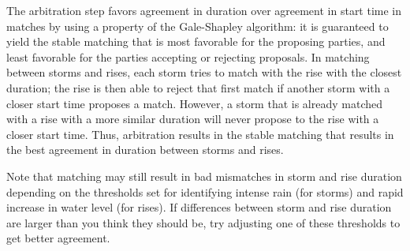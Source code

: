 \documentclass[11pt,a4paper]{article}
\begin{document}
The arbitration step favors agreement in duration over agreement in
start time in matches by using a property of the Gale-Shapley
algorithm: it is guaranteed to yield the stable matching that is most
favorable for the proposing parties, and least favorable for the
parties accepting or rejecting proposals.  In matching between storms
and rises, each storm tries to match with the rise with the closest
duration; the rise is then able to reject that first match if another
storm with a closer start time proposes a match.  However, a storm
that is already matched with a rise with a more similar duration will
never propose to the rise with a closer start time.  Thus, arbitration
results in the stable matching that results in the best agreement in
duration between storms and rises.

Note that matching may still result in bad mismatches in storm and
rise duration depending on the thresholds set for identifying intense
rain (for storms) and rapid increase in water level (for rises).  If
differences between storm and rise duration are larger than you think
they should be, try adjusting one of these thresholds to get better
agreement.
\end{document}
